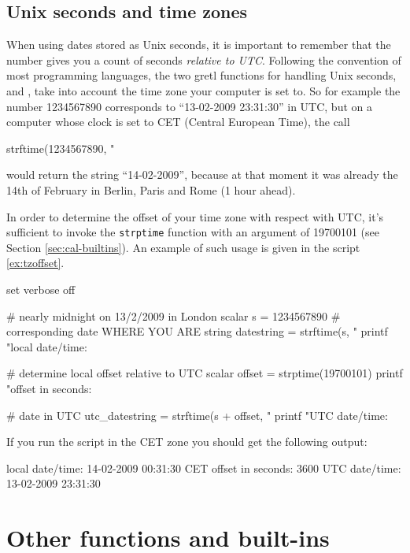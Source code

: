 \subsection{Unix seconds and time zones}

When using dates stored as Unix seconds, it is important to
remember that the number gives you a count of seconds \emph{relative
  to UTC}. Following the convention of most programming languages, the
two gretl functions for handling Unix seconds,  and
, take into account the time zone your computer is set
to. So for example the number 1234567890 corresponds to ``13-02-2009
23:31:30'' in UTC, but on a computer whose clock is set to CET
(Central European Time), the call
\begin{code}
  strftime(1234567890, "%
\end{code}
would return the string ``14-02-2009'', because at that moment it was
already the 14th of February in Berlin, Paris and Rome (1 hour ahead).

In order to determine the offset of your time zone with respect with
UTC, it's sufficient to invoke the \texttt{strptime} function with an
argument of 19700101 (see Section \ref{sec:cal-builtins}).  An example
of such usage is given in the script \ref{ex:tzoffset}.

\begin{script}[htbp]
  \label{ex:tzoffset}
\begin{scodebit}
set verbose off

# nearly midnight on 13/2/2009 in London
scalar s = 1234567890
# corresponding date WHERE YOU ARE
string datestring = strftime(s, "%
printf "local date/time: %

# determine local offset relative to UTC
scalar offset = strptime(19700101)
printf "offset in seconds: %

# date in UTC
utc_datestring = strftime(s + offset, "%
printf "UTC date/time: %
\end{scodebit}
If you run the script in the CET zone you should get the following
output:
\begin{outbit}
local date/time: 14-02-2009 00:31:30 CET
offset in seconds: 3600
UTC date/time: 13-02-2009 23:31:30
\end{outbit}
\end{script}

\section{Other functions and built-ins}
\label{sec:cal-otherfuncs}

